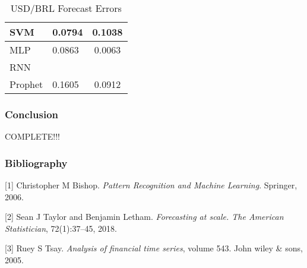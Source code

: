 \documentclass{beamer}
\begin{document}
\begin{frame}
\begin{table}
{\begin{tabular}{|lll|}
				\multicolumn{1}{|l|}{SVM}     & \multicolumn{1}{l|}{0.0794}       & \multicolumn{1}{c|}{0.1038}  \\ \hline
				\multicolumn{1}{|l|}{MLP}     & \multicolumn{1}{l|}{0.0863}       & \multicolumn{1}{c|}{0.0063}  \\ \hline
				\multicolumn{1}{|l|}{RNN}     & \multicolumn{1}{l|}{}       & \multicolumn{1}{c|}{}  \\ \hline
				\multicolumn{1}{|l|}{Prophet} & \multicolumn{1}{l|}{0.1605}       & \multicolumn{1}{c|}{0.0912}  \\ \hline
			\end{tabular}
			\caption{USD/BRL Forecast Errors}
		}
	\end{table}
	
\end{frame}
	
	\begin{frame}
		\frametitle{Conclusion}
		COMPLETE!!!
	\end{frame}
	
	\begin{frame}
		\frametitle{Bibliography}
		
		
		[1] Christopher M Bishop. \textit{Pattern Recognition and Machine
		Learning}. Springer, 2006.
		
		[2] Sean J Taylor and Benjamin Letham. \textit{Forecasting at scale. The
		American Statistician}, 72(1):37–45, 2018.
		
		[3] Ruey S Tsay. \textit{Analysis of financial time series}, volume 543.
		John wiley \& sons, 2005.
	\end{frame}
	
\end{document}

